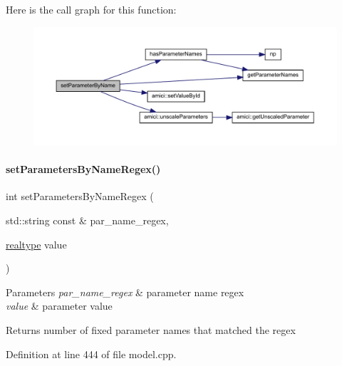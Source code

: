 Here is the call graph for this function\+:
\nopagebreak
\begin{figure}[H]
\begin{center}
\leavevmode
\includegraphics[width=350pt]{classamici_1_1_model_a6c5ceb2ba684cf68a7f21ad865091200_cgraph}
\end{center}
\end{figure}
\mbox{\label{classamici_1_1_model_a1307ed45ccda80e84174d6b495c85d8d}} 
\paragraph{\texorpdfstring{set\+Parameters\+By\+Name\+Regex()}{setParametersByNameRegex()}}
{\footnotesize\ttfamily int set\+Parameters\+By\+Name\+Regex (\begin{DoxyParamCaption}\item[{std\+::string const \&}]{par\+\_\+name\+\_\+regex,  }\item[{\mbox{\hyperlink{namespaceamici_a1bdce28051d6a53868f7ccbf5f2c14a3}{realtype}}}]{value }\end{DoxyParamCaption})}


\begin{DoxyParams}{Parameters}
{\em par\+\_\+name\+\_\+regex} & parameter name regex \\
\hline
{\em value} & parameter value \\
\hline
\end{DoxyParams}
\begin{DoxyReturn}{Returns}
number of fixed parameter names that matched the regex 
\end{DoxyReturn}


Definition at line 444 of file model.\+cpp.

